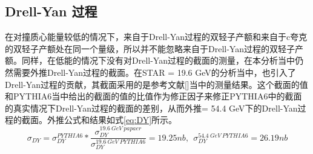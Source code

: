 \subsection{Drell-Yan 过程}

在对撞质心能量较低的情况下，来自于Drell-Yan过程的双轻子产额和来自于c夸克的双轻子产额处在同一个量级，所以并不能忽略来自于Drell-Yan过程的双轻子产额。同样，在低能的情况下没有对Drell-Yan过程的截面的测量，在本分析当中仍然需要外推Drell-Yan过程的截面。在STAR \sNN = 19.6 GeV的分析当中，也引入了Drell-Yan过程的贡献，其截面采用的是参考文献[]当中的测量结果。这个截面的值和PYTHIA6当中给出的截面的值的比值作为修正因子来修正PYTHIA6中的截面的真实情况下Drell-Yan过程的截面的差别，从而外推\sNN = 54.4 GeV下的Drell-Yan过程的截面。外推公式和结果如式\ref{eq:DY}所示。
\begin{equation}
    \label{eq:DY}
    \sigma_{DY} = \sigma_{DY}^{PYTHIA6}*\frac{\sigma_{DY}^{19.6~GeV~papaer}}{\sigma_{DY}^{19.6~GeV~PYTHIA6}} = 19.25nb, ~~ \sigma_{DY}^{54.4~GeV~PYTHIA6} = 26.19 nb
\end{equation}